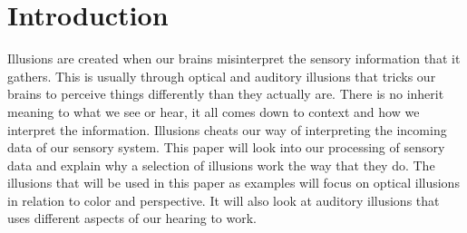 \chapter{Introduction}
Illusions are created when our brains misinterpret the sensory information that it gathers. This is usually through optical and auditory illusions that tricks our brains to perceive things differently than they actually are. There is no inherit meaning to what we see or hear, it all comes down to context and how we interpret the information. Illusions cheats our way of interpreting the incoming data of our sensory system. This paper will look into our processing of sensory data and explain why a selection of illusions work the way that they do. The illusions that will be used in this paper as examples will focus on optical illusions in relation to color and perspective. It will also look at auditory illusions that uses different aspects of our hearing to work.